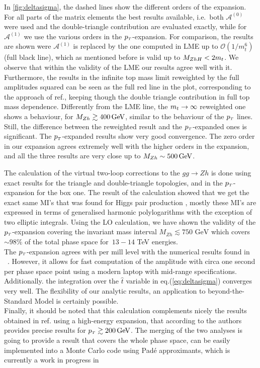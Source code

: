 In \autoref{fig:deltasigma}, the dashed lines show
 the different orders of the expansion. 
For all parts of the matrix elements the best results
available, i.e.~both $\mathcal{A}^{(0)}$ were used and the double-triangle
contribution are evaluated exactly, while for
$\mathcal{A}^{(1)}$ we use the various orders in the $p_{\scriptscriptstyle T}$-expansion.
For comparison, the results are shown were
$\mathcal{A}^{(1)}$ is replaced by the one computed in LME up to
$\mathcal{O}(1/m_t^6)$ (full black line), which as mentioned before is valid
up to $M_{ZhH}< 2 m_t$. We observe that within the validity of the LME our
results agree well with it.
Furthermore, the results in the infinite top
mass limit reweighted by the full amplitudes squared can be seen as the full red line in the plot, corresponding to the
approach of ref.\cite{Altenkamp:2012sx}, keeping though the double triangle
contribution in full top mass dependence. 
Differently from the LME line, the $m_t \to \infty$ reweighted one
shows a behaviour, for  $M_{Zh} \gtrsim 400\,\textrm{GeV}$, similar to the behaviour of
the $p_{\scriptscriptstyle T}$ lines. Still,   the difference
between the reweighted result and the $p_{\scriptscriptstyle T}$-expanded ones is  significant.
The $p_{\scriptscriptstyle T}$-expanded results show
very good convergence.  The zero order in our expansion agrees
extremely well with the higher orders in the expansion, and all the
three results are very close up to $M_{Zh} \sim 500\,\textrm{GeV}$.
\par  The calculation of the virtual two-loop corrections to the $gg \to Zh$ is done using exact results for the triangle and double-triangle topologies, and in the $p_{\scriptscriptstyle T}$-expansion for the box one.  The result of the calculation showed that we get the exact same MI's that was found for Higgs pair production \cite{Bonciani:2018omm} , mostly these MI's are expressed in terms of generalised harmonic polylogarithms with the
exception of two elliptic integrals. Using the LO calculation, we have shown the validity of the $p_{\scriptscriptstyle T}$-expansion covering the invariant mass interval  $M_{Zh}\lesssim 750\text{ GeV}$ which covers $\sim 98\%$ of the total phase space for~$13-14$ TeV energies.\\
The $p_{\scriptscriptstyle T}$-expansion agrees with per mill level with the numerical results found in ~\cite{Chen:2020gae}. However, it allows for fast computation of the amplitude with circa one second per phase space point using a modern laptop with mid-range specifications. Additionally. the integration over the $\hat{t}$ variable
in eq.(\ref{eq:deltasigma}) converges very well.  The flexibility of our analytic
results, an application to beyond-the-Standard Model is certainly
possible.\\ 
Finally, it should be noted that this calculation complements
nicely the results obtained in ref.\cite{Davies:2020drs} using a high-energy
expansion, that according to the authors provides precise results for
$p_{\scriptscriptstyle T} \gtrsim 200\,\textrm{GeV}$. The merging of the two analyses is going to provide
a result that covers the whole phase space, can be easily implemented into a
Monte Carlo code using  Pad\'e approximants, which is currently a work in progress in 